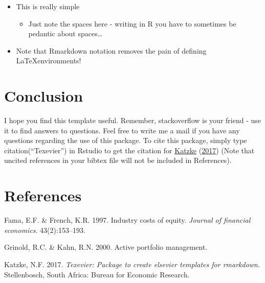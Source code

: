 \documentclass[11pt,preprint, authoryear]{elsarticle}
\numberwithin{equation}{section}
\numberwithin{figure}{section}
\numberwithin{table}{section}
\def\tightlist{} %
\newlength{\cslhangindent}
\newenvironment{CSLReferences}%
  {\setlength{\parindent}{0pt}%
  \everypar{\setlength{\hangindent}{\cslhangindent}}\ignorespaces}%
  {\par}
\begin{document}
\begin{itemize}
\item
  This is really simple

  \begin{itemize}
  \tightlist
  \item
    Just note the spaces here - writing in R you have to sometimes be
    pedantic about spaces\ldots{}
  \end{itemize}
\item
  Note that Rmarkdown notation removes the pain of defining
  \LaTeX environments!
\end{itemize}

\hypertarget{conclusion}{%
\section{Conclusion}\label{conclusion}}

I hope you find this template useful. Remember, stackoverflow is your
friend - use it to find answers to questions. Feel free to write me a
mail if you have any questions regarding the use of this package. To
cite this package, simply type citation(``Texevier'') in Rstudio to get
the citation for \protect\hyperlink{ref-Texevier}{Katzke}
(\protect\hyperlink{ref-Texevier}{2017}) (Note that uncited references
in your bibtex file will not be included in References).

\newpage

\hypertarget{references}{%
\section*{References}\label{references}}

\hypertarget{refs}{}
\begin{CSLReferences}{1}{0}
\leavevmode{}%
Fama, E.F. \& French, K.R. 1997. Industry costs of equity. \emph{Journal
of financial economics}. 43(2):153--193.

\leavevmode{}%
Grinold, R.C. \& Kahn, R.N. 2000. Active portfolio management.

\leavevmode{}%
Katzke, N.F. 2017. \emph{{Texevier}: {P}ackage to create elsevier
templates for rmarkdown}. Stellenbosch, South Africa: Bureau for
Economic Research.

\end{CSLReferences}
\end{document}

